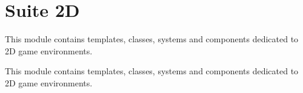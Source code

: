 \hypertarget{group__sdl__suite2d}{}\section{Suite 2D}
\label{group__sdl__suite2d}


This module contains templates, classes, systems and components dedicated to 2D game environments.  


This module contains templates, classes, systems and components dedicated to 2D game environments. 

